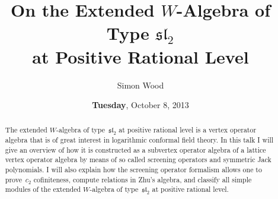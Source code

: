 \documentclass{UAmathtalk}
\author{Simon Wood}
\title{On the Extended $W$-Algebra of Type $\mathfrak{sl}_2$\\ at Positive Rational Level}
\date{\textbf{Tuesday}, October 8, 2013}
\begin{document}
\maketitle

\begin{abstract}
The extended $W$-algebra of type~$\mathfrak{sl}_2$ at positive rational level is a vertex operator algebra that is of great interest in logarithmic conformal field theory.
In this talk I will give an overview of how it is constructed as a subvertex operator algebra of a lattice vertex operator algebra by means of so called screening operators and symmetric Jack polynomials.
I will also explain how the screening operator formalism allows one to prove~$c_2$ cofiniteness, compute relations in Zhu's algebra, and classify all simple modules of the extended $W$-algebra of type~$\mathfrak{sl}_2$ at positive rational level. 
\end{abstract}
\end{document}
